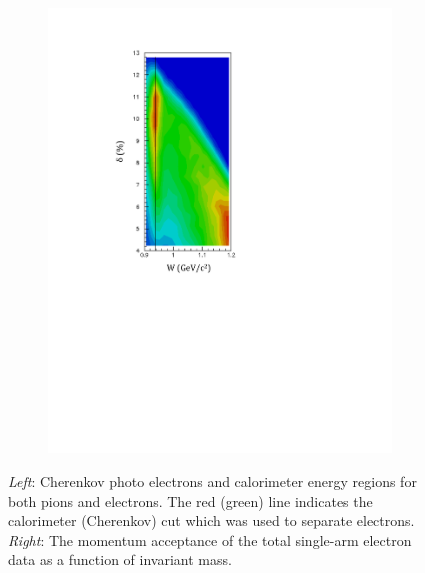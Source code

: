 \documentclass[12pt]{article}
\begin{document}
\begin{figure}[htbp]
\begin{subfigure}[htbp]{0.20\textwidth}
               \includegraphics[width=\textwidth]{delta}
                \label{dc_dist}
        \end{subfigure}    
\vspace{-0.4cm}         
\caption{\emph{Left}: Cherenkov photo electrons and calorimeter energy regions for both pions and electrons. The red (green) line indicates the calorimeter (Cherenkov) cut which was used to separate electrons. \emph{Right}: The momentum acceptance of the total single-arm electron data as a function of invariant mass.}
\label{dccalib}                  
\end{figure}
\end{document}
